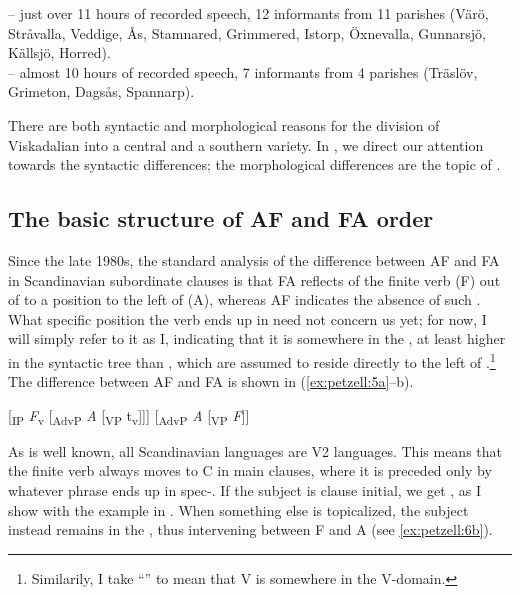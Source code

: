 \documentclass[output=paper,colorlinks,citecolor=brown,draft,draftmode]{langscibook}
\begin{document}
\ea\label{ex:petzell:4}
\ea  {} – just over 11 hours of recorded speech, 12 informants from 11 parishes (Värö, Stråvalla, Veddige, Ås, Stamnared, Grimmered, Istorp, Öxnevalla, Gunnarsjö, Källsjö, Horred).  \\
\ex\label{ex:petzell:4b}   – almost 10 hours of recorded speech, 7 informants from 4 parishes (Träslöv, Grimeton, Dagsås, Spannarp).
\z
\z


There are both syntactic and morphological reasons for the division of Viskadalian into a central and a southern variety. In , we direct our attention towards the syntactic differences; the morphological differences are the topic of .


\subsection{The basic structure of AF and FA order}\label{sec:petzell:2.2}\largerpage[2]


Since the late 1980s, the standard analysis of the difference between AF and FA in Scandinavian subordinate clauses is that FA reflects  of the finite verb (F) out of  to a position to the left of  (A), whereas AF indicates the absence of such . What specific position the verb ends up in need not concern us yet; for now, I will simply refer to it as I, indicating that it is somewhere in the , at least higher in the syntactic tree than , which are assumed to reside directly to the left of .\footnote{Similarily, I take “” to mean that V is somewhere in the V-domain.} The difference between AF and FA is shown in (\ref{ex:petzell:5a}–b).


\ea\label{ex:petzell:5}
\ea\label{ex:petzell:5a}
[\textsubscript{IP} \textit{F}\textsubscript{v} [\textsubscript{AdvP} \textit{A} [\textsubscript{VP} t\textsubscript{v}]]]                      
\ex\label{ex:petzell:5b}{}  [\textsubscript{AdvP} \textit{A} [\textsubscript{VP} \textit{F}]]                        
\z
\z


As is well known, all Scandinavian languages are V2 languages. This means that the finite verb always moves to C in main clauses, where it is preceded only by whatever phrase ends up in spec-. If the subject is clause initial, we get , as I show with the  example in . When something else is topicalized, the subject instead remains in the , thus intervening between F and A (see \ref{ex:petzell:6b}).
\end{document}
